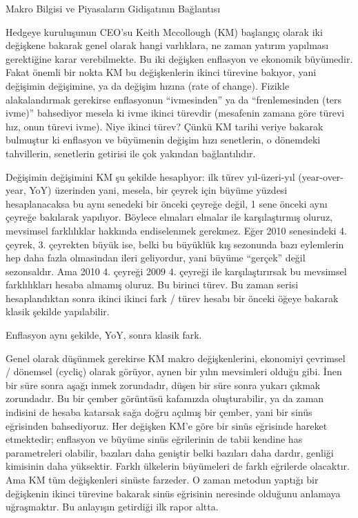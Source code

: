 \documentclass[12pt,fleqn]{article}\usepackage{../../common}
\begin{document}
Makro Bilgisi ve Piyasaların Gidişatının Bağlantısı

Hedgeye kuruluşunun CEO'su Keith Mccollough (KM) başlangıç olarak iki değişkene
bakarak genel olarak hangi varlıklara, ne zaman yatırım yapılması gerektiğine
karar verebilmekte. Bu iki değişken enflasyon ve ekonomik büyümedir. Fakat
önemli bir nokta KM bu değişkenlerin ikinci türevine bakıyor, yani değişimin
değişimine, ya da değişim hızına (rate of change). Fizikle alakalandırmak
gerekirse enflasyonun ``ivmesinden'' ya da ``frenlemesinden (ters ivme)''
bahsediyor mesela ki ivme ikinci türevdir (mesafenin zamana göre türevi hız,
onun türevi ivme). Niye ikinci türev? Çünkü KM tarihi veriye bakarak bulmuştur
ki enflasyon ve büyümenin değişim hızı senetlerin, o dönemdeki tahvillerin,
senetlerin getirisi ile çok yakından bağlantılıdır.

Değişimin değişimini KM şu şekilde hesaplıyor: ilk türev yıl-üzeri-yıl
(year-over-year, YoY) üzerinden yani, mesela, bir çeyrek için büyüme yüzdesi
hesaplanacaksa bu aynı senedeki bir önceki çeyreğe değil, 1 sene önceki aynı
çeyreğe bakılarak yapılıyor. Böylece elmaları elmalar ile karşılaştırmış oluruz,
mevsimsel farklılıklar hakkında endiselenmek gerekmez. Eğer 2010 senesindeki
4. çeyrek, 3. çeyrekten büyük ise, belki bu büyüklük kış sezonunda bazı
eylemlerin hep daha fazla olmasindan ileri geliyordur, yani büyüme ``gerçek''
değil sezonsaldır. Ama 2010 4. çeyreği 2009 4. çeyreği ile karşılaştırırsak bu
mevsimsel farklılıkları hesaba almamış oluruz. Bu birinci türev. Bu zaman serisi
hesaplandıktan sonra ikinci ikinci fark / türev hesabı bir önceki öğeye bakarak
klasik şekilde yapılabilir.

Enflasyon aynı şekilde, YoY, sonra klasik fark.

Genel olarak düşünmek gerekirse KM makro değişkenlerini, ekonomiyi çevrimsel /
dönemsel (cycliç) olarak görüyor, aynen bir yılın mevsimleri olduğu gibi. İnen
bir süre sonra aşağı inmek zorundadır, düşen bir süre sonra yukarı çıkmak
zorundadır. Bu bir çember görüntüsü kafamızda oluşturabilir, ya da zaman
indisini de hesaba katarsak sağa doğru açılmış bir çember, yani bir sinüs
eğrisinden bahsediyoruz. Her değişken KM'e göre bir sinüs eğrisinde hareket
etmektedir; enflasyon ve büyüme sinüs eğrilerinin de tabii kendine has
parametreleri olabilir, bazıları daha geniştir belki bazıları daha dardır,
genliği kimisinin daha yüksektir. Farklı ülkelerin büyümeleri de farklı
eğrilerde olacaktır. Ama KM tüm değişkenleri sinüste farzeder. O zaman metodun
yaptığı bir değişkenin ikinci türevine bakarak sinüs eğrisinin neresinde
olduğunu anlamaya uğraşmaktır. Bu anlayışın getirdiği ilk rapor altta.
\end{document}
